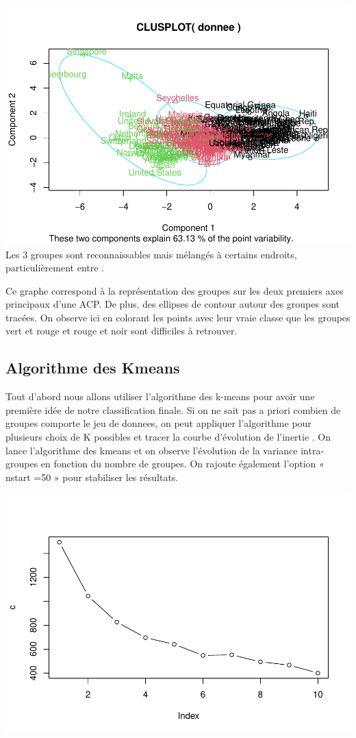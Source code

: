 \documentclass[
]{article}
\begin{document}
\includegraphics{Projet_files/figure-latex/unnamed-chunk-22-1.pdf} Les 3
groupes sont reconnaissables mais mélangés à certains endroits,
particulièrement entre .

Ce graphe correspond à la représentation des groupes sur les deux
premiers axes principaux d'une ACP. De plus, des ellipses de contour
autour des groupes sont tracées. On observe ici en colorant les points
avec leur vraie classe que les groupes vert et rouge et rouge et noir
sont difficiles à retrouver.

\hypertarget{algorithme-des-kmeans}{%
\subsection{Algorithme des Kmeans}\label{algorithme-des-kmeans}}

Tout d'abord nous allons utiliser l'algorithme des k-means pour avoir
une première idée de notre classification finale. Si on ne sait pas a
priori combien de groupes comporte le jeu de donnees, on peut appliquer
l'algorithme pour plusieurs choix de K possibles et tracer la courbe
d'évolution de l'inertie . On lance l'algorithme des kmeans et on
observe l'évolution de la variance intra-groupes en fonction du nombre
de groupes. On rajoute également l'option « nstart =50 » pour stabiliser
les résultats.

\includegraphics{Projet_files/figure-latex/unnamed-chunk-23-1.pdf}
\end{document}
